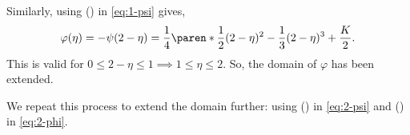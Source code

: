 \documentclass[11pt]{penrose}
\begin{document}
\begin{problem}{6}
    Similarly, using (\textasteriskcentered\textasteriskcentered) in \eqref{eq:1-psi} gives,
    \begin{equation}
        \varphi(\eta)
        = -\psi(2-\eta)
        = \frac{1}{4} \paren*{\frac{1}{2}(2-\eta)^2 - \frac{1}{3}(2-\eta)^3} + \frac{K}{2}. \label{eq:2-phi}
    \end{equation}
    This is valid for $0 \leq 2-\eta \leq 1 \implies 1 \leq \eta \leq 2$. So, the domain of $\varphi$ has been extended.

    We repeat this process to extend the domain further: using (\textasteriskcentered) in \eqref{eq:2-psi} and (\textasteriskcentered\textasteriskcentered) in \eqref{eq:2-phi}.
\end{problem}
\end{document}
